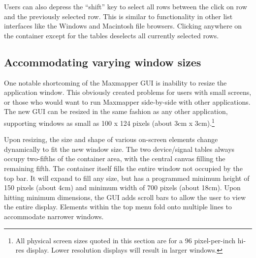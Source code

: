 Users can also depress the ``shift'' key to select all rows between the click on row and the previously selected row. This is similar to functionality in other list interfaces like the Windows and Macintosh file browsers. Clicking anywhere on the container except for the tables deselects all currently selected rows.
	

	\subsection{Accommodating varying window sizes} %
	\label{sec:accomodating_sizes}

One notable shortcoming of the Maxmapper GUI is inability to resize the application window. This obviously created problems for users with small screens, or those who would want to run Maxmapper side-by-side with other applications. The new GUI can be resized in the same fashion as any other application, supporting windows as small as 100 x 124 pixels (about 3cm x 3cm).\footnote{All physical screen sizes quoted in this section are for a 96 pixel-per-inch hi-res display. Lower resolution displays will result in larger windows.}

Upon resizing, the size and shape of various on-screen elements change dynamically to fit the new window size. The two device/signal tables always occupy two-fifths of the container area, with the central canvas filling the remaining fifth. The container itself fills the entire window not occupied by the top bar. It will expand to fill any size, but has a programmed minimum height of 150 pixels (about 4cm) and minimum width of 700 pixels (about 18cm). Upon hitting minimum dimensions, the GUI adds scroll bars to allow the user to view the entire display. Elements within the top menu fold onto multiple lines to accommodate narrower windows.

